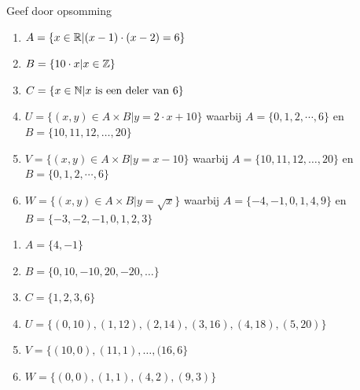 \begin{oef}
Geef door opsomming
\begin{enumerate}
  \item $A=\{x \in \mathbb{R} | (x-1)\cdot(x-2)=6\}$
  \item $B=\{10\cdot x|x\in\mathbb{Z} \}$
  \item $C=\{ x\in \mathbb{N}| x \textrm{ is een deler van } 6\}$
  \item $U = \{(x, y) \in A \times B|y = 2\cdot x + 10\}$ waarbij $A = \{0,1,2,\cdots,6\}$ en \\$B = \{10,11,12,\dots,20\}$
  \item $V = \{(x, y) \in A \times B|y = x - 10\}$ waarbij  $A = \{10,11,12,\dots,20\}$ en \\ $B = \{0,1,2,\cdots,6\}$
  \item $W = \{(x, y) \in A \times  B|y = \sqrt{x}\}$ waarbij $A=\{-4,-1,0,1,4,9\}$ en \\ 
        $B=\{-3,-2,-1,0,1,2,3\}$
\end{enumerate}
\begin{opl}
\begin{enumerate}
  \item $A=\{4,-1\}$
  \item $B=\{0,10,-10,20,-20,\dots\}$
  \item $C=\{1,2,3,6\}$
  \item $U=\{(0,10),(1,12),(2,14),(3,16),(4,18),(5,20)\}$
  \item $V=\{(10,0),(11,1),\dots, (16,6\}$
  \item $W=\{(0,0),(1,1),(4,2),(9,3)\}$
\end{enumerate}
\end{opl}
\end{oef}


